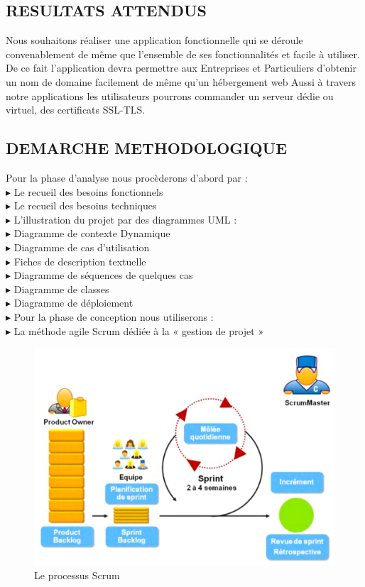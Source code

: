 \documentclass[a4paper, 12pt]{report}
\begin{document}
\subsection{RESULTATS ATTENDUS}
\noindent Nous souhaitons réaliser une application fonctionnelle qui se déroule convenablement de même que l’ensemble de ses fonctionnalités et facile à utiliser.
De ce fait l’application devra permettre aux Entreprises et Particuliers d’obtenir un nom de domaine facilement de même qu’un hébergement web 
Aussi à travers notre applications les utilisateurs pourrons commander un serveur dédie ou virtuel, des certificats SSL-TLS.
\subsection{DEMARCHE METHODOLOGIQUE}
\noindent Pour la phase d’analyse nous procèderons d’abord par :
\noindent
\\
$\blacktriangleright$ Le recueil des besoins fonctionnels 
\noindent
\\
$\blacktriangleright$ Le recueil des besoins techniques  
\noindent
\\
$\blacktriangleright$ L’illustration du projet par des diagrammes UML :
\\
$\blacktriangleright$ Diagramme de contexte Dynamique
\\
$\blacktriangleright$ Diagramme de cas d’utilisation
\\
$\blacktriangleright$ Fiches de description textuelle
\\
$\blacktriangleright$ Diagramme de séquences de quelques cas
\noindent
\\
$\blacktriangleright$ Diagramme de classes
\\
$\blacktriangleright$ Diagramme de déploiement
\\
$\blacktriangleright$ Pour la phase de conception nous utiliserons :
\\
$\blacktriangleright$ La méthode agile Scrum dédiée à la « gestion de projet »
\\
\begin{figure}[H]
	\centering
	\includegraphics{img/scrumprocess}
	\caption{Le processus Scrum}
	\label{Tux}
\end{figure}
\end{document}
